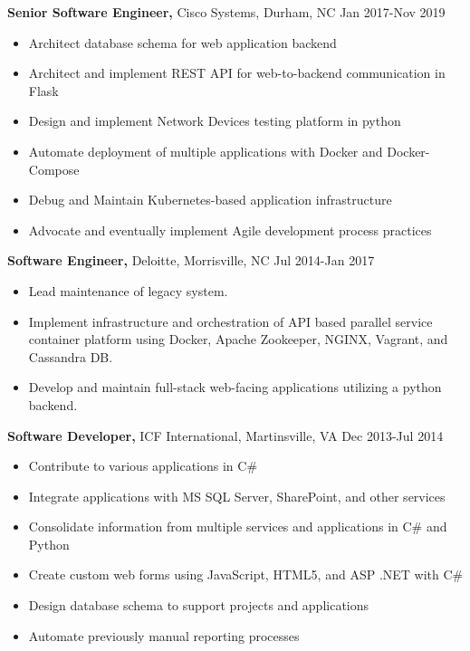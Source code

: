 \documentclass{res}
\begin{document}
\begin{resume}
  {\bf Senior Software Engineer,} Cisco Systems, Durham, NC \hfill Jan 2017-Nov 2019
    \begin{itemize} \itemsep -2pt
      \item Architect database schema for web application backend
      \item Architect and implement REST API for web-to-backend communication in Flask
      \item Design and implement Network Devices testing platform in python
      \item Automate deployment of multiple applications with Docker and Docker-Compose
      \item Debug and Maintain Kubernetes-based application infrastructure
      \item Advocate and eventually implement Agile development process practices
    \end{itemize}

  {\bf Software Engineer,} Deloitte, Morrisville, NC \hfill Jul 2014-Jan 2017
    \begin{itemize} \itemsep -2pt
     \item Lead maintenance of legacy system.
     \item Implement infrastructure and orchestration of API based parallel service container platform using Docker, Apache Zookeeper, NGINX, Vagrant, and Cassandra DB.
     \item Develop and maintain full-stack web-facing applications utilizing a python backend.
     \end{itemize}
  
  {\bf Software Developer,} ICF International, Martinsville, VA \hfill Dec 2013-Jul 2014
    \begin{itemize} \itemsep -2pt  %
      \item Contribute to various applications in C\#
      \item Integrate applications with MS SQL Server, SharePoint, and other services
      \item Consolidate information from multiple services and applications in C\# and Python
      \item Create custom web forms using JavaScript, HTML5, and ASP .NET with C\#
      \item Design database schema to support projects and applications
      \item Automate previously manual reporting processes
    \end{itemize}


\end{resume}
\end{document}
